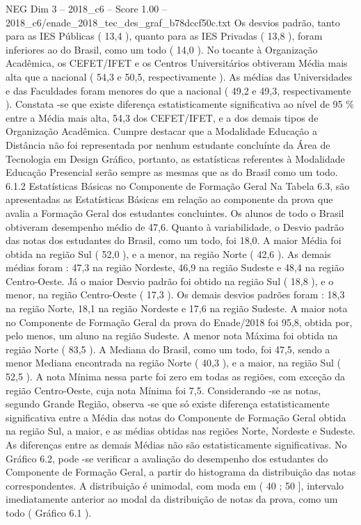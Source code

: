 \begin{textsample}{NEG Dim 3 – 2018\_c6 – Score 1.00 – 2018\_c6/enade\_2018\_tec\_des\_graf\_b78dccf50c.txt}
Os desvios padrão, tanto para as IES Públicas ( 13,4 ), quanto para as IES Privadas ( 13,8 ), foram inferiores ao do Brasil, como um todo ( 14,0 ).
No tocante à Organização Acadêmica, os CEFET/IFET e os Centros Universitários obtiveram Média mais alta que a nacional ( 54,3 e 50,5, respectivamente ).
As médias das Universidades e das Faculdades foram menores do que a nacional ( 49,2 e 49,3, respectivamente ).
Constata -se que existe diferença estatisticamente significativa ao nível de 95 \% entre a Média mais alta, 54,3 dos CEFET/IFET, e a dos demais tipos de Organização Acadêmica.
Cumpre destacar que a Modalidade Educação a Distância não foi representada por nenhum estudante concluínte da Área de Tecnologia em Design Gráfico, portanto, as estatísticas referentes à Modalidade Educação Presencial serão sempre as mesmas que as do Brasil como um todo. 6.1.2 Estatísticas Básicas no Componente de Formação Geral Na Tabela 6.3, são apresentadas as Estatísticas Básicas em relação ao componente da prova que avalia a Formação Geral dos estudantes concluintes.
Os alunos de todo o Brasil obtiveram desempenho médio de 47,6.
Quanto à variabilidade, o Desvio padrão das notas dos estudantes do Brasil, como um todo, foi 18,0.
A maior Média foi obtida na região Sul ( 52,0 ), e a menor, na região Norte ( 42,6 ).
As demais médias foram : 47,3 na região Nordeste, 46,9 na região Sudeste e 48,4 na região Centro-Oeste.
Já o maior Desvio padrão foi obtido na região Sul ( 18,8 ), e o menor, na região Centro-Oeste ( 17,3 ).
Os demais desvios padrões foram : 18,3 na região Norte, 18,1 na região Nordeste e 17,6 na região Sudeste.
A maior nota no Componente de Formação Geral da prova do Enade/2018 foi 95,8, obtida por, pelo menos, um aluno na região Sudeste.
A menor nota Máxima foi obtida na região Norte ( 83,5 ).
A Mediana do Brasil, como um todo, foi 47,5, sendo a menor Mediana encontrada na região Norte ( 40,3 ), e a maior, na região Sul ( 52,5 ).
A nota Mínima nessa parte foi zero em todas as regiões, com exceção da região Centro-Oeste, cuja nota Mínima foi 7,5.
Considerando -se as notas, segundo Grande Região, observa -se que só existe diferença estatisticamente significativa entre a Média das notas do Componente de Formação Geral obtida na região Sul, a maior, e as médias obtidas nas regiões Norte, Nordeste e Sudeste.
As diferenças entre as demais Médias não são estatisticamente significativas.
No Gráfico 6.2, pode -se verificar a avaliação do desempenho dos estudantes do Componente de Formação Geral, a partir do histograma da distribuição das notas correspondentes.
A distribuição é unimodal, com moda em ( 40 ; 50 ], intervalo imediatamente anterior ao modal da distribuição de notas da prova, como um todo ( Gráfico 6.1 ).

\end{textsample}

